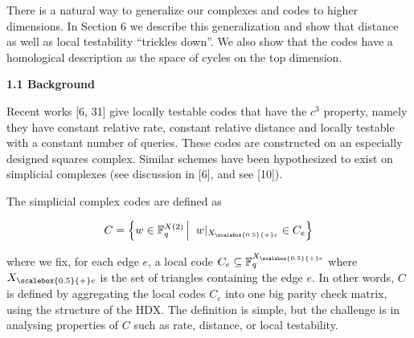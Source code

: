\documentclass[10pt,a4paper]{article}
\begin{document}



There is a natural way to generalize our complexes and codes to higher dimensions. In Section 6 we describe this generalization and show that distance as well as local testability “trickles down”. We also show that the codes have a homological description as the space of cycles on the top dimension.\par




\par\medskip\noindent\textbf{
1.1 Background}\par




Recent works [6, 31] give locally testable codes that have the $c^{3}$ property, namely they have constant relative rate, constant relative distance and locally testable with a constant number of queries. These codes are constructed on an especially designed squares complex. Similar schemes have been hypothesized to exist on simplicial complexes (see discussion in [6], and see [10]).\par




The simplicial complex codes are defined as\par


\[\begin{gathered}
C=\left\{w\in\mathbb{F}_{q}^{X(2)}\left|\;\vphantom{w\in\mathbb{F}_{q}^{X(2)}w|_{{X}_{\scalebox{0.5}{+}e}}\in C_{e}}\right.w|_{{X}_{\scalebox{0.5}{+}e}}\in C_{e}\right\}
\end{gathered}\]


where we fix, for each edge $e$, a local code $C_{e}\subseteq\mathbb{F}_{q}^{{X}_{\scalebox{0.5}{+}e}}$ where ${X}_{\scalebox{0.5}{+}e}$ is the set of triangles containing the edge $e$. In other words, $C$ is defined by aggregating the local codes $C_{e}$ into one big parity check matrix, using the structure of the HDX. The definition is simple, but the challenge is in analysing properties of $C$ such as rate, distance, or local testability.\par
\end{document}
